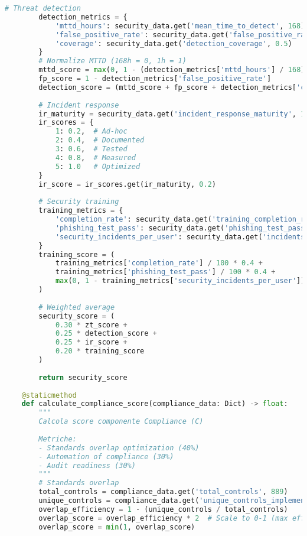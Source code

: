 \begin{lstlisting}[language=Python, caption=Calcolo Score Componenti GIST]
        # Threat detection
        detection_metrics = {
            'mttd_hours': security_data.get('mean_time_to_detect', 168),
            'false_positive_rate': security_data.get('false_positive_rate', 0.5),
            'coverage': security_data.get('detection_coverage', 0.5)
        }
        # Normalize MTTD (168h = 0, 1h = 1)
        mttd_score = max(0, 1 - (detection_metrics['mttd_hours'] / 168))
        fp_score = 1 - detection_metrics['false_positive_rate']
        detection_score = (mttd_score + fp_score + detection_metrics['coverage']) / 3
        
        # Incident response
        ir_maturity = security_data.get('incident_response_maturity', 1)
        ir_scores = {
            1: 0.2,  # Ad-hoc
            2: 0.4,  # Documented
            3: 0.6,  # Tested
            4: 0.8,  # Measured
            5: 1.0   # Optimized
        }
        ir_score = ir_scores.get(ir_maturity, 0.2)
        
        # Security training
        training_metrics = {
            'completion_rate': security_data.get('training_completion_rate', 0),
            'phishing_test_pass': security_data.get('phishing_test_pass_rate', 0),
            'security_incidents_per_user': security_data.get('incidents_per_user', 1)
        }
        training_score = (
            training_metrics['completion_rate'] / 100 * 0.4 +
            training_metrics['phishing_test_pass'] / 100 * 0.4 +
            max(0, 1 - training_metrics['security_incidents_per_user']) * 0.2
        )
        
        # Weighted average
        security_score = (
            0.30 * zt_score +
            0.25 * detection_score +
            0.25 * ir_score +
            0.20 * training_score
        )
        
        return security_score
    
    @staticmethod
    def calculate_compliance_score(compliance_data: Dict) -> float:
        """
        Calcola score componente Compliance (C)
        
        Metriche:
        - Standards overlap optimization (40%)
        - Automation of compliance (30%)
        - Audit readiness (30%)
        """
        # Standards overlap
        total_controls = compliance_data.get('total_controls', 889)
        unique_controls = compliance_data.get('unique_controls_implemented', 889)
        overlap_efficiency = 1 - (unique_controls / total_controls)
        overlap_score = overlap_efficiency * 2  # Scale to 0-1 (max efficiency ~50%)
        overlap_score = min(1, overlap_score)
        

\end{lstlisting}
